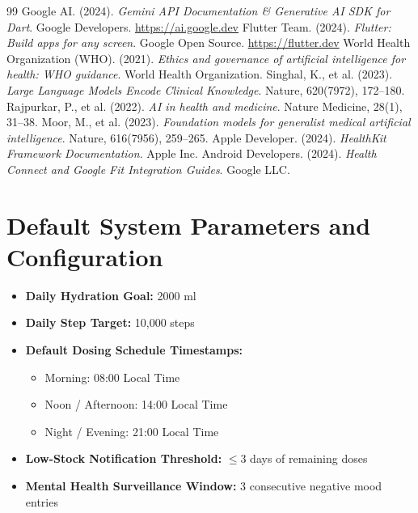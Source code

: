 \documentclass[12pt,a4paper,oneside]{report}
\begin{document}
\begin{thebibliography}{99}
 Google AI. (2024). \textit{Gemini API Documentation \& Generative AI SDK for Dart}. Google Developers. \url{https://ai.google.dev}
 Flutter Team. (2024). \textit{Flutter: Build apps for any screen}. Google Open Source. \url{https://flutter.dev}
 World Health Organization (WHO). (2021). \textit{Ethics and governance of artificial intelligence for health: WHO guidance}. World Health Organization.
 Singhal, K., et al. (2023). \textit{Large Language Models Encode Clinical Knowledge}. Nature, 620(7972), 172--180.
 Rajpurkar, P., et al. (2022). \textit{AI in health and medicine}. Nature Medicine, 28(1), 31--38.
 Moor, M., et al. (2023). \textit{Foundation models for generalist medical artificial intelligence}. Nature, 616(7956), 259--265.
 Apple Developer. (2024). \textit{HealthKit Framework Documentation}. Apple Inc.
 Android Developers. (2024). \textit{Health Connect and Google Fit Integration Guides}. Google LLC.
\end{thebibliography}

\appendix
\chapter{Default System Parameters and Configuration}
\begin{itemize}
    \item \textbf{Daily Hydration Goal:} 2000 ml
    \item \textbf{Daily Step Target:} 10,000 steps
    \item \textbf{Default Dosing Schedule Timestamps:}
    \begin{itemize}
        \item Morning: 08:00 Local Time
        \item Noon / Afternoon: 14:00 Local Time
        \item Night / Evening: 21:00 Local Time
    \end{itemize}
    \item \textbf{Low-Stock Notification Threshold:} $\le 3$ days of remaining doses
    \item \textbf{Mental Health Surveillance Window:} 3 consecutive negative mood entries
\end{itemize}
\end{document}
